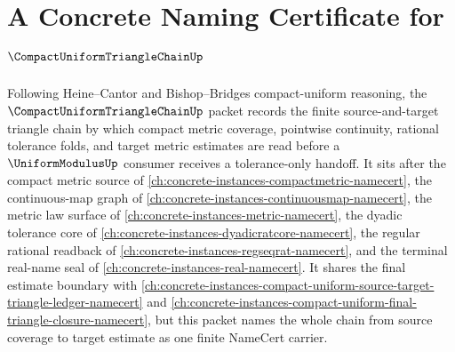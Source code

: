 \chapter{A Concrete Naming Certificate for $\CompactUniformTriangleChainUp$}
\label{ch:concrete-instances-compact-uniform-triangle-chain-namecert}

Following Heine--Cantor and Bishop--Bridges compact-uniform reasoning, the $\CompactUniformTriangleChainUp$ packet records the finite source-and-target triangle chain by which compact metric coverage, pointwise continuity, rational tolerance folds, and target metric estimates are read before a $\UniformModulusUp$ consumer receives a tolerance-only handoff. It sits after the compact metric source of \autoref{ch:concrete-instances-compactmetric-namecert}, the continuous-map graph of \autoref{ch:concrete-instances-continuousmap-namecert}, the metric law surface of \autoref{ch:concrete-instances-metric-namecert}, the dyadic tolerance core of \autoref{ch:concrete-instances-dyadicratcore-namecert}, the regular rational readback of \autoref{ch:concrete-instances-regseqrat-namecert}, and the terminal real-name seal of \autoref{ch:concrete-instances-real-namecert}. It shares the final estimate boundary with \autoref{ch:concrete-instances-compact-uniform-source-target-triangle-ledger-namecert} and \autoref{ch:concrete-instances-compact-uniform-final-triangle-closure-namecert}, but this packet names the whole chain from source coverage to target estimate as one finite NameCert carrier.

